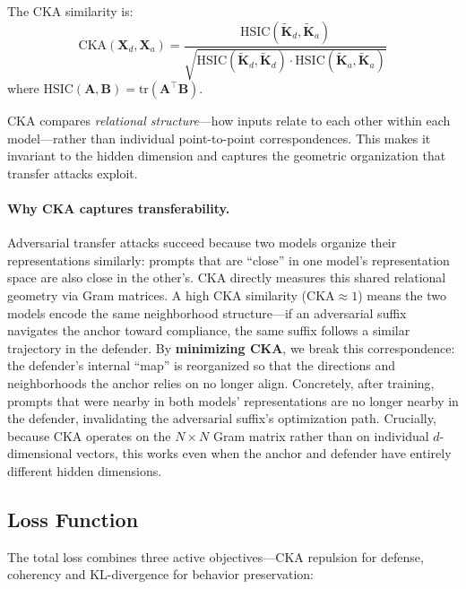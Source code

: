 \documentclass[11pt]{article}
\begin{document}
The CKA similarity is:
\begin{equation}
    \text{CKA}(\mathbf{X}_d, \mathbf{X}_a) = \frac{\text{HSIC}(\tilde{\mathbf{K}}_d, \tilde{\mathbf{K}}_a)}{\sqrt{\text{HSIC}(\tilde{\mathbf{K}}_d, \tilde{\mathbf{K}}_d) \cdot \text{HSIC}(\tilde{\mathbf{K}}_a, \tilde{\mathbf{K}}_a)}}
\end{equation}
where $\text{HSIC}(\mathbf{A}, \mathbf{B}) = \text{tr}(\mathbf{A}^\top \mathbf{B})$.

CKA compares \emph{relational structure}---how inputs relate to each other within each model---rather than individual point-to-point correspondences. This makes it invariant to the hidden dimension and captures the geometric organization that transfer attacks exploit.

\paragraph{Why CKA captures transferability.}
Adversarial transfer attacks succeed because two models organize their representations similarly: prompts that are ``close'' in one model's representation space are also close in the other's. CKA directly measures this shared relational geometry via Gram matrices. A high CKA similarity ($\text{CKA} \approx 1$) means the two models encode the same neighborhood structure---if an adversarial suffix navigates the anchor toward compliance, the same suffix follows a similar trajectory in the defender. By \textbf{minimizing CKA}, we break this correspondence: the defender's internal ``map'' is reorganized so that the directions and neighborhoods the anchor relies on no longer align. Concretely, after training, prompts that were nearby in both models' representations are no longer nearby in the defender, invalidating the adversarial suffix's optimization path. Crucially, because CKA operates on the $N \times N$ Gram matrix rather than on individual $d$-dimensional vectors, this works even when the anchor and defender have entirely different hidden dimensions.

\subsection{Loss Function}

The total loss combines three active objectives---CKA repulsion for defense, coherency and KL-divergence for behavior preservation:
\end{document}
